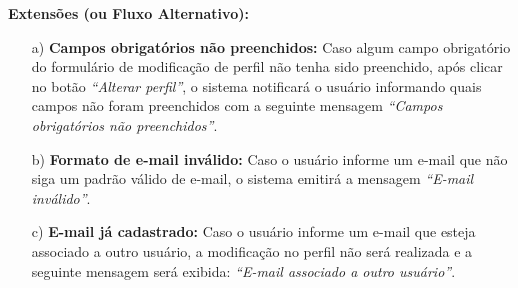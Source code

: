 \begin{mdframed}
\begin{flushleft}
		\textbf{Extensões (ou Fluxo Alternativo):}
		\begin{itemize}
			\item[a)] \textbf{Campos obrigatórios não preenchidos:} Caso algum campo obrigatório do formulário de modificação de perfil não tenha sido preenchido, após clicar no botão \textit{``Alterar perfil''}, o sistema notificará o usuário informando quais campos não foram preenchidos com a seguinte mensagem \textit{``Campos obrigatórios não preenchidos''}.
			\item[b)] \textbf{Formato de e-mail inválido:} Caso o usuário informe um e-mail que não siga um padrão válido de e-mail, o sistema emitirá a mensagem \textit{``E-mail inválido''}.
			\item[c)] \textbf{E-mail já cadastrado:} Caso o usuário informe um e-mail que esteja associado a outro usuário, a modificação no perfil não será realizada e a seguinte mensagem será exibida: \emph{``E-mail associado a outro usuário''}.
		\end{itemize}


		\end{flushleft}

	\end{mdframed}


